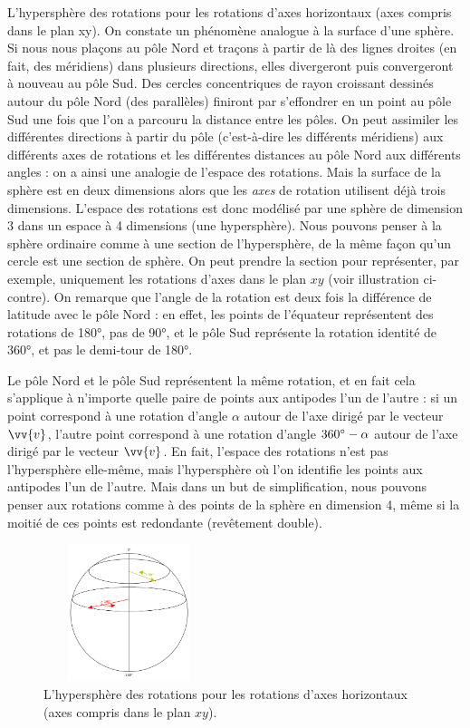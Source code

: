 L'hypersphère des rotations pour les rotations d'axes horizontaux (axes compris dans le plan xy).
On constate un phénomène analogue à la surface d'une sphère. Si nous nous plaçons au pôle Nord et traçons à partir de là des lignes droites (en fait, des méridiens) dans plusieurs directions, elles divergeront puis convergeront à nouveau au pôle Sud. Des cercles concentriques de rayon croissant dessinés autour du pôle Nord (des parallèles) finiront par s'effondrer en un point au pôle Sud une fois que l'on a parcouru la distance entre les pôles. On peut assimiler les différentes directions à partir du pôle (c'est-à-dire les différents méridiens) aux différents axes de rotations et les différentes distances au pôle Nord aux différents angles : on a ainsi une analogie de l'espace des rotations. Mais la surface de la sphère est en deux dimensions alors que les \emph{axes} de rotation utilisent déjà trois dimensions. L'espace des rotations est donc modélisé par une sphère de dimension 3 dans un espace à 4 dimensions (une hypersphère). Nous pouvons penser à la sphère ordinaire comme à une section de l'hypersphère, de la même façon qu'un cercle est une section de sphère. On peut prendre la section pour représenter, par exemple, uniquement les rotations d'axes dans le plan $xy$ (voir illustration ci-contre). On remarque que l'angle de la rotation est deux fois la différence de latitude avec le pôle Nord : en effet, les points de l'équateur représentent des rotations de \ang{180}, pas de \ang{90}, et le pôle Sud représente la rotation identité de \ang{360}, et pas le demi-tour de \ang{180}.

Le pôle Nord et le pôle Sud représentent la même rotation, et en fait cela s'applique à n'importe quelle paire de points aux antipodes l'un de l'autre : si un point correspond à une rotation d'angle $\alpha$ autour de l'axe dirigé par le vecteur $\vv{v}$, l'autre point correspond à une rotation d'angle $\text{\ang{360}} - \alpha$ autour de l'axe dirigé par le vecteur $\vv{v}$. En fait, l'espace des rotations n'est pas l'hypersphère elle-même, mais l'hypersphère où l'on identifie les points aux antipodes l'un de l'autre. Mais dans un but de simplification, nous pouvons penser aux rotations comme à des points de la sphère en dimension 4, même si la moitié de ces points est redondante (revêtement double).

\begin{figure}[ht]
	\centering
	\includegraphics[width=5cm,height=4cm]{ressources/hypersphere_rotations}\hfill
	\caption{L'hypersphère des rotations pour les rotations d'axes horizontaux (axes compris dans le plan $xy$).}
	\label{hypersphere_rotations}
\end{figure}